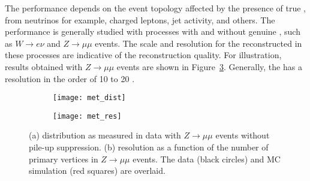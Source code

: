 The \met performance depends on the event topology affected by the presence of true \met, from neutrinos for example,
charged leptons, jet activity, and others.
The \met performance is generally studied with processes with and without genuine \met, such as 
$W \to e \nu$ and $Z\to\mu\mu$ events. 
The scale and resolution for the reconstructed \met in these processes are indicative of the reconstruction quality.
For illustration, results obtained with  $Z\to\mu\mu$ events are shown in Figure~\ref{fig:exp.reco.met}.
Generally, the \met has a resolution in the order of 10 to 20 \GeV.


\begin{figure}[t!]
\centering
\begin{subfigure}[t]{0.48\textwidth}
\texttt{[image: met\_dist]}
\subcaption{}
\label{fig:exp.reco.met_dist}
\end{subfigure}
\begin{subfigure}[t]{0.48\textwidth}
\texttt{[image: met\_res]}
\subcaption{}
\label{fig:exp.reco.met_res}
\end{subfigure}
\vspace{-0.25cm}
\caption{
(a) \met distribution as measured in data with $Z\to\mu\mu$ events without pile-up suppression.
(b) \met resolution as a function of the number of primary vertices in $Z\to\mu\mu$ events. The data (black circles) and MC simulation (red squares) are overlaid. 
}
\label{fig:exp.reco.met}
\end{figure} 
